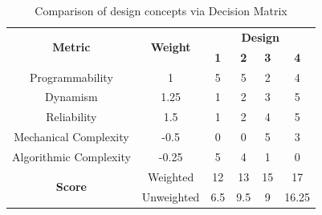 \documentclass[11pt]{report}
\begin{document}
\begin{table}[h]
\centering
\begin{tabular}{|c|c|c|c|c|c|}
\hline
\multirow{2}{*}{\textbf{Metric}} & \multirow{2}{*}{\textbf{Weight}} & \multicolumn{4}{c|}{\textbf{Design}} \\ \cline{3-6}
 &  & \textbf{1} & \textbf{2} & \textbf{3} & \textbf{4} \\ \hline
Programmability  & 1      & 5       & 5       & 2       & 4       \\ \hline
Dynamism         & 1.25   & 1       & 2       & 3       & 5       \\ \hline
Reliability       & 1.5    & 1       & 2       & 4       & 5       \\ \hline
Mechanical Complexity & -0.5   & 0       & 0       & 5       & 3       \\ \hline
Algorithmic Complexity & -0.25  & 5       & 4       & 1       & 0       \\ \hline \hline
\multirow{2}{*}{\textbf{Score}} &     Weighted   & 12       & 13      & 15    & 17      \\ \cline{2-6}
&    Unweighted    & 6.5    & 9.5   & 9    & 16.25      \\ \hline
\end{tabular}
\caption{Comparison of design concepts via Decision Matrix}
\label{tab:matrix}
\end{table}

\newpage
\end{document}
